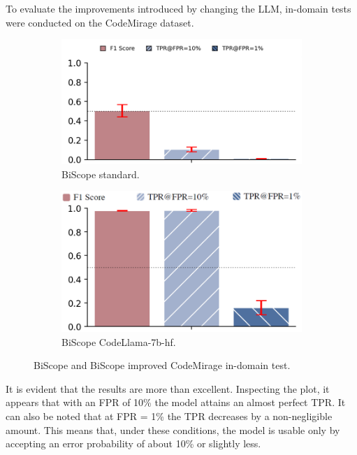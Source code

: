 To evaluate the improvements introduced by changing the LLM, in-domain 
tests were conducted on the CodeMirage dataset.
\begin{figure}[H]
    \centering
    \begin{subfigure}[b]{0.45\textwidth}
        \centering
        \includegraphics[width=\linewidth]{img/clearcut.png}
        \caption{BiScope standard.}
        \label{fig:BiScope standard.}
    \end{subfigure}
    \hfill
    \begin{subfigure}[b]{0.45\textwidth}
        \centering
        \includegraphics[width=\linewidth]{img/BiScope/test_noramle_migliorato.png}
        \caption{BiScope CodeLlama-7b-hf.}
        \label{fig:BiScope CodeLlama-7b-hf.}
    \end{subfigure}
    \caption{BiScope and BiScope improved CodeMirage in-domain test.}
    \label{fig:BiScope and BiScope improved CodeMirage in-domain test.}
\end{figure}

It is evident that the results are more than excellent. Inspecting the plot, 
it appears that with an FPR of 10\% the model attains an almost perfect TPR. 
It can also be noted that at FPR = 1\% the TPR decreases by a non-negligible 
amount. This means that, under these conditions, the model is usable only by 
accepting an error probability of about 10\% or slightly less.

